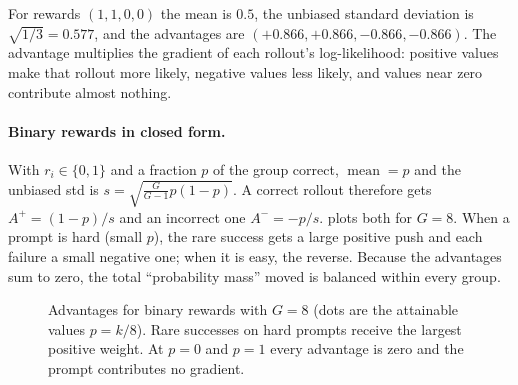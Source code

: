 For rewards $(1,1,0,0)$ the mean is $0.5$, the unbiased standard deviation is
$\sqrt{1/3}=0.577$, and the advantages are $(+0.866,+0.866,-0.866,-0.866)$. The advantage
multiplies the gradient of each rollout's log-likelihood: positive values make that
rollout more likely, negative values less likely, and values near zero contribute almost
nothing.

\paragraph{Binary rewards in closed form.} With $r_i\in\{0,1\}$ and a fraction $p$ of the
group correct, $\operatorname{mean}=p$ and the unbiased std is
$s=\sqrt{\tfrac{G}{G-1}p(1-p)}$. A correct rollout therefore gets
$A^+=(1-p)/s$ and an incorrect one $A^-=-p/s$.  plots both for
$G=8$. When a prompt is hard (small $p$), the rare success gets a large positive push and
each failure a small negative one; when it is easy, the reverse. Because the advantages sum
to zero, the total ``probability mass'' moved is balanced within every group.

\begin{figure}[ht]
\centering
{}
\caption{Advantages for binary rewards with $G=8$ (dots are the attainable values
$p=k/8$). Rare successes on hard prompts receive the largest positive weight. At $p=0$ and
$p=1$ every advantage is zero and the prompt contributes no gradient.}
\label{fig:grpo:advplot}
\end{figure}


